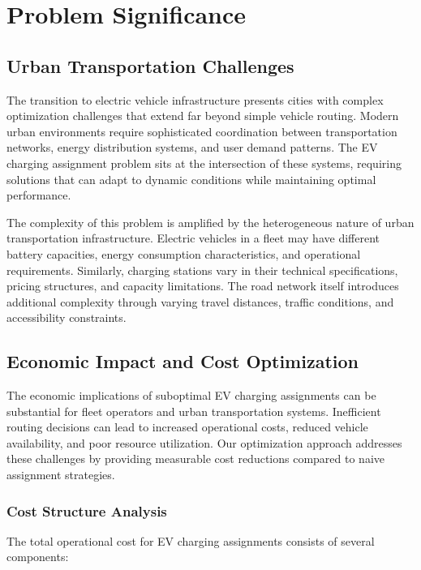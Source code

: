 \documentclass[12pt,a4paper]{article}
\begin{document}
\section{Problem Significance}

\subsection{Urban Transportation Challenges}

The transition to electric vehicle infrastructure presents cities with complex optimization challenges that extend far beyond simple vehicle routing. Modern urban environments require sophisticated coordination between transportation networks, energy distribution systems, and user demand patterns. The EV charging assignment problem sits at the intersection of these systems, requiring solutions that can adapt to dynamic conditions while maintaining optimal performance.

The complexity of this problem is amplified by the heterogeneous nature of urban transportation infrastructure. Electric vehicles in a fleet may have different battery capacities, energy consumption characteristics, and operational requirements. Similarly, charging stations vary in their technical specifications, pricing structures, and capacity limitations. The road network itself introduces additional complexity through varying travel distances, traffic conditions, and accessibility constraints.

\subsection{Economic Impact and Cost Optimization}

The economic implications of suboptimal EV charging assignments can be substantial for fleet operators and urban transportation systems. Inefficient routing decisions can lead to increased operational costs, reduced vehicle availability, and poor resource utilization. Our optimization approach addresses these challenges by providing measurable cost reductions compared to naive assignment strategies.

\subsubsection{Cost Structure Analysis}

The total operational cost for EV charging assignments consists of several components:
\end{document}
